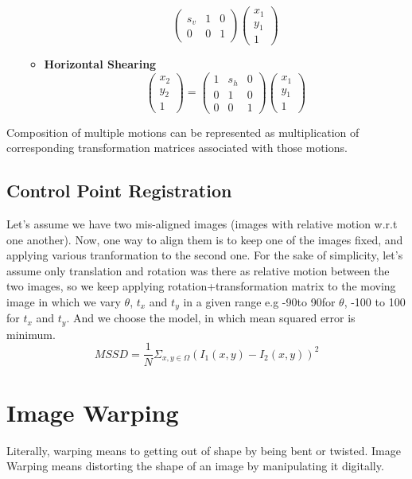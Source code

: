 \documentclass{report}
\begin{document}
\begin{itemize}
\begin{itemize}
\[\begin{pmatrix}
        s_v & 1 & 0\\
        0 & 0 & 1
    \end{pmatrix}
    \begin{pmatrix}
        x_1\\
        y_1\\
        1
    \end{pmatrix}
    \]
    \item \textbf{Horizontal Shearing}
    \[
    \begin{pmatrix}
        x_2\\
        y_2\\
        1
    \end{pmatrix}
    =
    \begin{pmatrix}
        1 & s_h & 0\\
        0 & 1 & 0\\
        0 & 0 & 1
    \end{pmatrix}
    \begin{pmatrix}
        x_1\\
        y_1\\
        1
    \end{pmatrix}
    \]
    \end{itemize}
\end{itemize}
Composition of multiple motions can be represented as multiplication of corresponding transformation matrices associated with those motions.
\subsection{Control Point Registration} Let's assume we have two mis-aligned images      (images with relative motion w.r.t one another). Now, one way to align them is to keep one of the images fixed, and applying various tranformation to the second one. For the sake of simplicity, let's assume only translation and rotation was there as relative motion between the two images, so we keep applying rotation+transformation matrix to the moving image in which we vary $\theta$, $t_x$ and $t_y$ in a given range e.g -90\textdegree \nobreakspace to 90\textdegree \nobreakspace for $\theta$, -100 to 100 for $t_x$ and $t_y$. And we choose the model, in which mean squared error is minimum.
\[ MSSD = \frac{1}{N}\Sigma_{x,y \in \Omega}(I_1(x,y) - I_2(x,y))^2 \]
\section{Image Warping}
Literally, warping means to getting out of shape by being bent or twisted.
Image Warping means distorting the shape of an image by manipulating it digitally. 
\end{document}
